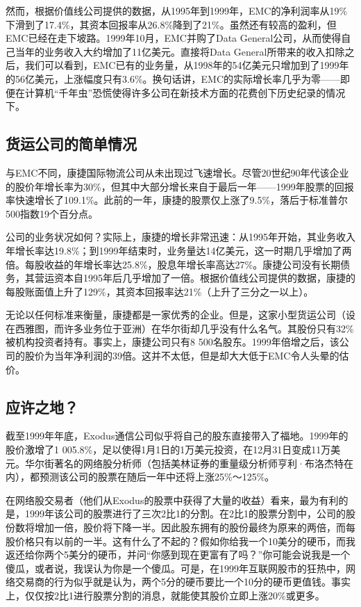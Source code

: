 \documentclass[12pt,oneside]{book}
\begin{document}
然而，根据价值线公司提供的数据，从1995年到1999年，EMC的净利润率从19\%下滑到了17.4\%，其资本回报率从26.8\%降到了21\%。虽然还有较高的盈利，但EMC已经在走下坡路。1999年10月，EMC并购了Data General公司，从而使得自己当年的业务收入大约增加了11亿美元。直接将Data General所带来的收入扣除之后，我们可以看到，EMC已有的业务量，从1998年的54亿美元只增加到了1999年的56亿美元，上涨幅度只有3.6\%。换句话讲，EMC的实际增长率几乎为零——即便在计算机“千年虫”恐慌使得许多公司在新技术方面的花费创下历史纪录的情况下。

\subsection{货运公司的简单情况}
与EMC不同，康捷国际物流公司从未出现过飞速增长。尽管20世纪90年代该企业的股价年增长率为30\%，但其中大部分增长来自于最后一年——1999年股票的回报率快速增长了109.1\%。此前的一年，康捷的股票仅上涨了9.5\%，落后于标准普尔500指数19个百分点。

公司的业务状况如何？实际上，康捷的增长非常迅速：从1995年开始，其业务收入年增长率达19.8\%；到1999年结束时，业务量达14亿美元，这一时期几乎增加了两倍。每股收益的年增长率达25.8\%，股息年增长率高达27\%。康捷公司没有长期债务，其营运资本自1995年后几乎增加了一倍。根据价值线公司提供的数据，康捷的每股账面值上升了129\%，其资本回报率达21\%（上升了三分之一以上）。

无论以任何标准来衡量，康捷都是一家优秀的企业。但是，这家小型货运公司（设在西雅图，而许多业务位于亚洲）在华尔街却几乎没有什么名气。其股份只有32\%被机构投资者持有。事实上，康捷公司只有8 500名股东。1999年倍增之后，该公司的股价为当年净利润的39倍。这并不太低，但是却大大低于EMC令人头晕的估价。

\subsection{应许之地？}
截至1999年年底，Exodus通信公司似乎将自己的股东直接带入了福地。1999年的股价激增了1 005.8\%，足以使得1月1日的1万美元投资，在12月31日变成11万美元。华尔街著名的网络股分析师（包括美林证券的重量级分析师亨利·布洛杰特在内），都预测该公司的股票在随后一年中还将上涨25\%～125\%。

在网络股交易者（他们从Exodus的股票中获得了大量的收益）看来，最为有利的是，1999年该公司的股票进行了三次2比1的分割。在2比1的股票分割中，公司的股份数将增加一倍，股价将下降一半。因此股东拥有的股份最终为原来的两倍，而每股价格只有以前的一半。这有什么了不起的？假如你给我一个10美分的硬币，而我返还给你两个5美分的硬币，并问“你感到现在更富有了吗？”你可能会说我是一个傻瓜，或者说，我误认为你是一个傻瓜。可是，在1999年互联网股市的狂热中，网络交易商的行为似乎就是认为，两个5分的硬币要比一个10分的硬币更值钱。事实上，仅仅按2比1进行股票分割的消息，就能使其股价立即上涨20\%或更多。
\end{document}
